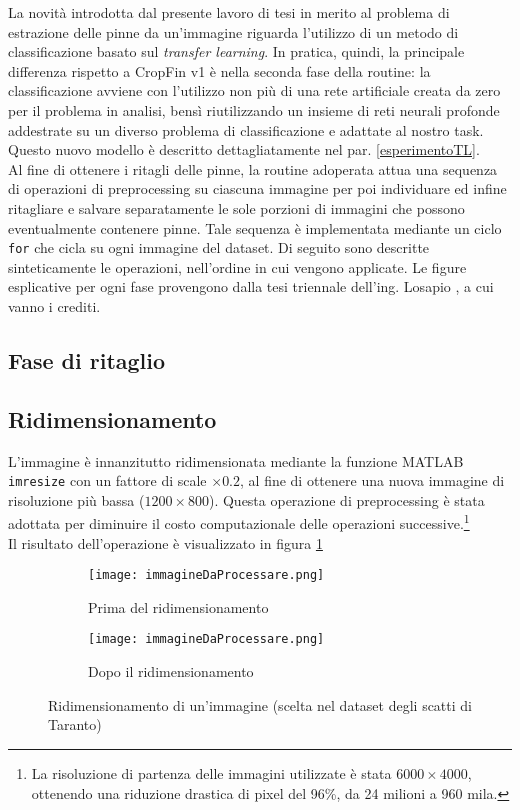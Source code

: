 La novità introdotta dal presente lavoro di tesi in merito al problema di estrazione delle pinne da un'immagine riguarda l'utilizzo di un metodo di classificazione basato sul \textit{transfer learning}. In pratica, quindi, la principale differenza rispetto a CropFin v1 è nella seconda fase della routine: la classificazione avviene con l'utilizzo non più di una rete artificiale creata da zero per il problema in analisi, bensì riutilizzando un insieme di reti neurali profonde addestrate su un diverso problema di classificazione e adattate al nostro task. Questo nuovo modello è descritto dettagliatamente nel par. \ref{esperimentoTL}.\\

Al fine di ottenere i ritagli delle pinne, la routine adoperata attua una sequenza di operazioni di preprocessing su ciascuna immagine per poi individuare ed infine ritagliare e salvare separatamente le sole porzioni di immagini che possono eventualmente contenere pinne. Tale sequenza è implementata mediante un ciclo \verb|for| che cicla su ogni immagine del dataset. Di seguito sono descritte sinteticamente le operazioni, nell'ordine in cui vengono applicate. Le figure esplicative per ogni fase provengono dalla tesi triennale dell'ing. Losapio \cite{gianvito}, a cui vanno i crediti.

\subsection{Fase di ritaglio}
\label{faseRitaglio}

\subsection*{Ridimensionamento}
L'immagine è innanzitutto ridimensionata mediante la funzione MATLAB \verb|imresize| con un fattore di scale $\times 0.2$, al fine di ottenere una nuova immagine di risoluzione più bassa ($1200\times 800$).
Questa operazione di preprocessing è stata adottata per diminuire il costo computazionale delle operazioni successive.\footnote{La risoluzione di partenza delle immagini utilizzate è stata $6000\times 4000$, ottenendo una riduzione drastica di pixel del 96\%, da 24 milioni a 960 mila.}\\

\noindent Il risultato dell'operazione è visualizzato in figura \ref{fig:ridimensionamento}

\begin{figure}[h]
  \centering
  \begin{subfigure}[b]{0.475\textwidth}
    \texttt{[image: immagineDaProcessare.png]}
    \caption{Prima del ridimensionamento}
  \end{subfigure}
  \begin{subfigure}[b]{0.475\textwidth}
  \centering
    \texttt{[image: immagineDaProcessare.png]}
    \caption{Dopo il ridimensionamento}
  \end{subfigure}
  \caption{Ridimensionamento di un'immagine (scelta nel dataset degli scatti di Taranto)}
  \label{fig:ridimensionamento}
\end{figure}


